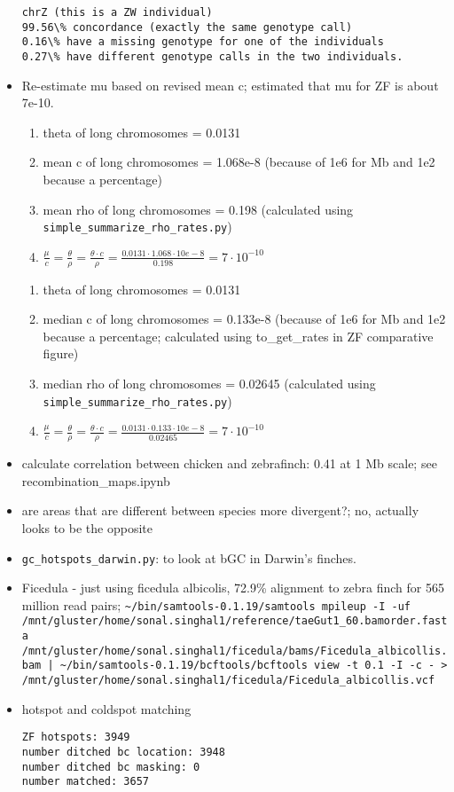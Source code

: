 \documentclass[idxtotoc,hyperref,openany,oneside]{labbook} %
\begin{document}
\begin{itemize}
\begin{verbatim}
chrZ (this is a ZW individual)
99.56\% concordance (exactly the same genotype call)
0.16\% have a missing genotype for one of the individuals
0.27\% have different genotype calls in the two individuals.
\end{verbatim}
\item Re-estimate mu based on revised mean c; estimated that mu for ZF is about 7e-10.
\begin{enumerate}
	\item theta of long chromosomes = 0.0131
	\item mean c of long chromosomes =  1.068e-8 (because of 1e6 for Mb and 1e2 because a percentage)
	\item mean rho of long chromosomes = 0.198 (calculated using \verb+simple_summarize_rho_rates.py+)
	\item $ \frac{\mu}{c} = \frac{\theta}{\rho} = \frac{\theta \cdot c}{\rho}  = \frac{0.0131 \cdot 1.068 \cdot 10e-8}{0.198} = 7 \cdot 10^{-10}$
\end{enumerate}
\begin{enumerate}
	\item theta of long chromosomes = 0.0131
	\item median c of long chromosomes =  0.133e-8 (because of 1e6 for Mb and 1e2 because a percentage; calculated using to\_get\_rates in ZF comparative figure)
	\item median rho of long chromosomes = 0.02645 (calculated using \verb+simple_summarize_rho_rates.py+)
	\item $ \frac{\mu}{c} = \frac{\theta}{\rho} = \frac{\theta \cdot c}{\rho}  = \frac{0.0131 \cdot 0.133 \cdot 10e-8}{0.02465} = 7 \cdot 10^{-10}$
\end{enumerate}
\item calculate correlation between chicken and zebrafinch: 0.41 at 1 Mb scale; see recombination\_maps.ipynb
\item are areas that are different between species more divergent?; no, actually looks to be the opposite
\item \verb+gc_hotspots_darwin.py+: to look at bGC in Darwin's finches.
\item Ficedula - just using ficedula albicolis, 72.9\% alignment to zebra finch for 565 million read pairs; \verb+~/bin/samtools-0.1.19/samtools mpileup -I -uf /mnt/gluster/home/sonal.singhal1/reference/taeGut1_60.bamorder.fasta /mnt/gluster/home/sonal.singhal1/ficedula/bams/Ficedula_albicollis.bam | ~/bin/samtools-0.1.19/bcftools/bcftools view -t 0.1 -I -c - > /mnt/gluster/home/sonal.singhal1/ficedula/Ficedula_albicollis.vcf+
\item hotspot and coldspot matching
\begin{verbatim}
ZF hotspots: 3949
number ditched bc location: 3948
number ditched bc masking: 0 
number matched: 3657


\end{verbatim}
\end{itemize}
\end{document}
